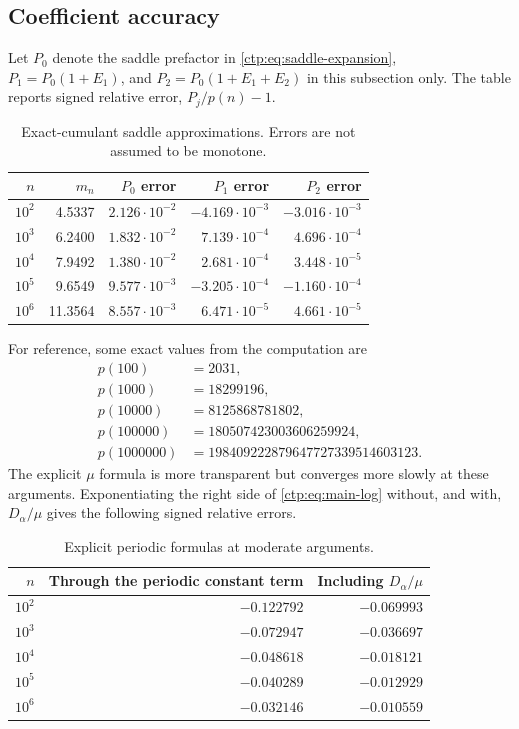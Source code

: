 \documentclass[11pt,a4paper]{article}
\numberwithin{equation}{section}
\theoremstyle{definition}
\theoremstyle{remark}
\begin{document}
\subsection{Coefficient accuracy}
Let $P_0$ denote the saddle prefactor in \eqref{ctp:eq:saddle-expansion},
$P_1=P_0(1+E_1)$, and $P_2=P_0(1+E_1+E_2)$ in this subsection only.
The table reports signed relative error, $P_j/p(n)-1$.

\begin{table}[htbp]
\centering
\caption{Exact-cumulant saddle approximations. Errors are not assumed to be monotone.}
\label{ctp:tab:saddle}
\begin{tabular}{rrrrr}
\toprule
$n$ & $m_n$ & $P_0$ error & $P_1$ error & $P_2$ error\\
\midrule
$10^2$ & 4.5337 & $2.126\cdot10^{-2}$ & $-4.169\cdot10^{-3}$ & $-3.016\cdot10^{-3}$\\
$10^3$ & 6.2400 & $1.832\cdot10^{-2}$ & $7.139\cdot10^{-4}$ & $4.696\cdot10^{-4}$\\
$10^4$ & 7.9492 & $1.380\cdot10^{-2}$ & $2.681\cdot10^{-4}$ & $3.448\cdot10^{-5}$\\
$10^5$ & 9.6549 & $9.577\cdot10^{-3}$ & $-3.205\cdot10^{-4}$ & $-1.160\cdot10^{-4}$\\
$10^6$ & 11.3564 & $8.557\cdot10^{-3}$ & $6.471\cdot10^{-5}$ & $4.661\cdot10^{-5}$\\
\bottomrule
\end{tabular}
\end{table}

For reference, some exact values from the computation are
\begin{align*}
 p(100)&=2031,\\
 p(1000)&=18299196,\\
 p(10000)&=8125868781802,\\
 p(100000)&=180507423003606259924,\\
 p(1000000)&=198409222879647727339514603123.
\end{align*}
The explicit $\mu$ formula is more transparent but converges more slowly
at these arguments. Exponentiating the right side of
\eqref{ctp:eq:main-log} without, and with, $D_\alpha/\mu$ gives the following
signed relative errors.

\begin{table}[htbp]
\centering
\caption{Explicit periodic formulas at moderate arguments.}
\label{ctp:tab:explicit}
\begin{tabular}{rrr}
\toprule
$n$ & Through the periodic constant term & Including $D_\alpha/\mu$\\
\midrule
$10^2$ & $-0.122792$ & $-0.069993$\\
$10^3$ & $-0.072947$ & $-0.036697$\\
$10^4$ & $-0.048618$ & $-0.018121$\\
$10^5$ & $-0.040289$ & $-0.012929$\\
$10^6$ & $-0.032146$ & $-0.010559$\\
\bottomrule
\end{tabular}
\end{table}
\end{document}
